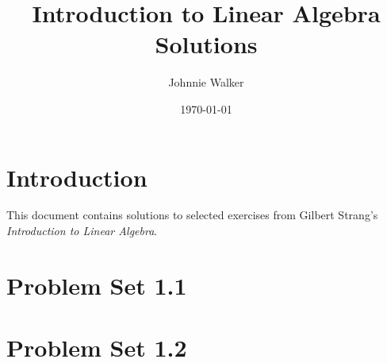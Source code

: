 \documentclass{article}
\title{Introduction to Linear Algebra Solutions}
\author{Johnnie Walker}
\date{\today}
\begin{document}
\maketitle
\tableofcontents

\section*{Introduction}

This document contains solutions to selected exercises from Gilbert Strang's \textit{Introduction to Linear Algebra}.

\section*{Problem Set 1.1}


\section*{Problem Set 1.2}
\end{document}
